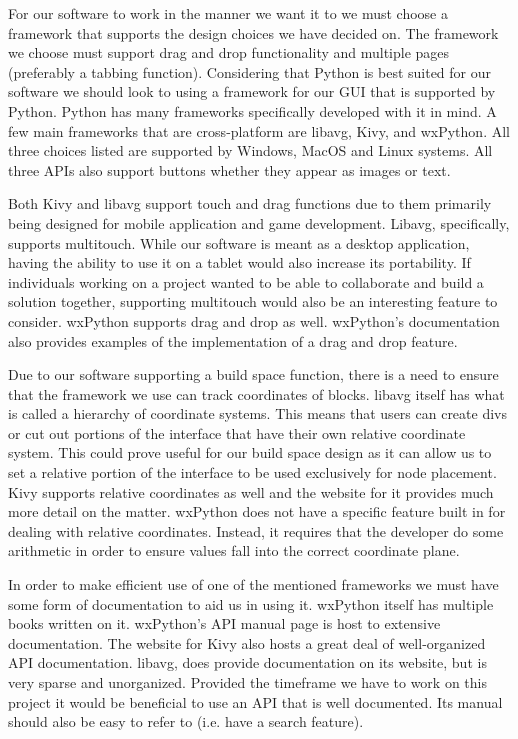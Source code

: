 \documentclass[journal,10pt,onecolumn,compsoc]{IEEEtran} \usepackage[margin=1.0in]{geometry} \usepackage{pdfpages} \usepackage{graphicx}
\begin{document}
\noindent For our software to work in the manner we want it to we must choose a framework that supports the design choices we have decided on.
The framework we choose must support drag and drop functionality and multiple pages (preferably a tabbing function).
Considering that Python is best suited for our software we should look to using a framework for our GUI that is supported by Python.
Python has many frameworks specifically developed with it in mind.
A few main frameworks that are cross-platform are libavg, Kivy, and wxPython.
All three choices listed are supported by Windows, MacOS and Linux systems. 
All three APIs also support buttons whether they appear as images or text.

\noindent Both Kivy and libavg support touch and drag functions due to them primarily being designed for mobile application and game development. \cite{Kivy}\cite{libavg} 
Libavg, specifically, supports multitouch.
While our software is meant as a desktop application, having the ability to use it on a tablet would also increase its portability.
If individuals working on a project wanted to be able to collaborate and build a solution together, supporting multitouch would also be an interesting feature to consider.
wxPython supports drag and drop as well. 
wxPython's documentation also provides examples of the implementation of a drag and drop feature. \cite{wxPython} 

\noindent Due to our software supporting a build space function, there is a need to ensure that the framework we use can track coordinates of blocks.
libavg itself has what is called a hierarchy of coordinate systems. \cite{libavg} 
This means that users can create divs or cut out portions of the interface that have their own relative coordinate system.
This could prove useful for our build space design as it can allow us to set a relative portion of the interface to be used exclusively for node placement.
Kivy supports relative coordinates as well and the website for it provides much more detail on the matter. \cite{Kivy} 
wxPython does not have a specific feature built in for dealing with relative coordinates. \cite{wxPython}
Instead, it requires that the developer do some arithmetic in order to ensure values fall into the correct coordinate plane.

\noindent In order to make efficient use of one of the mentioned frameworks we must have some form of documentation to aid us in using it.
wxPython itself has multiple books written on it. %
wxPython's API manual page is host to extensive documentation.
The website for Kivy also hosts a great deal of well-organized API documentation.
libavg, does provide documentation on its website, but is very sparse and unorganized.
Provided the timeframe we have to work on this project it would be beneficial to use an API that is well documented. 
Its manual should also be easy to refer to (i.e. have a search feature).
\end{document}
